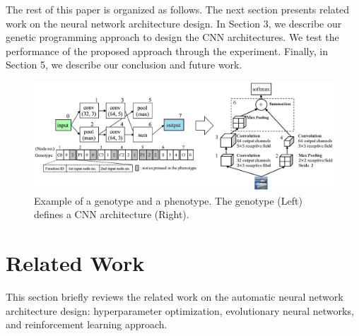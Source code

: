 The rest of this paper is organized as follows. The next section presents related work on the neural network architecture design. In Section 3, we describe our genetic programming approach to design the CNN architectures. We test the performance of the proposed approach through the experiment. Finally, in Section 5, we describe our conclusion and future work.


\begin{figure}[t]
\includegraphics[scale=0.65]{images/genotype.eps}
\caption{Example of a genotype and a phenotype. The genotype (Left) defines a CNN architecture (Right).}
\label{genotype}
\end{figure}
\section{Related Work}
This section briefly reviews the related work on the automatic neural network architecture design: hyperparameter optimization, evolutionary neural networks, and reinforcement learning approach.

